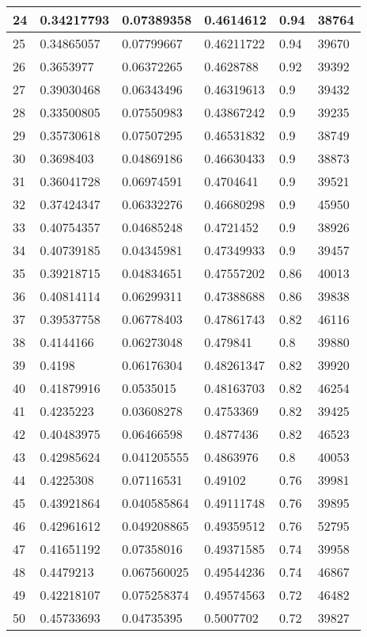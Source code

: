 \begin{longtable}{|l|l|l|l|l|l|}
24 & 0.34217793 & 0.07389358 & 0.4614612 & 0.94 & 38764 \\ \hline 
25 & 0.34865057 & 0.07799667 & 0.46211722 & 0.94 & 39670 \\ \hline 
26 & 0.3653977 & 0.06372265 & 0.4628788 & 0.92 & 39392 \\ \hline 
27 & 0.39030468 & 0.06343496 & 0.46319613 & 0.9 & 39432 \\ \hline 
28 & 0.33500805 & 0.07550983 & 0.43867242 & 0.9 & 39235 \\ \hline 
29 & 0.35730618 & 0.07507295 & 0.46531832 & 0.9 & 38749 \\ \hline 
30 & 0.3698403 & 0.04869186 & 0.46630433 & 0.9 & 38873 \\ \hline 
31 & 0.36041728 & 0.06974591 & 0.4704641 & 0.9 & 39521 \\ \hline 
32 & 0.37424347 & 0.06332276 & 0.46680298 & 0.9 & 45950 \\ \hline 
33 & 0.40754357 & 0.04685248 & 0.4721452 & 0.9 & 38926 \\ \hline 
34 & 0.40739185 & 0.04345981 & 0.47349933 & 0.9 & 39457 \\ \hline 
35 & 0.39218715 & 0.04834651 & 0.47557202 & 0.86 & 40013 \\ \hline 
36 & 0.40814114 & 0.06299311 & 0.47388688 & 0.86 & 39838 \\ \hline 
37 & 0.39537758 & 0.06778403 & 0.47861743 & 0.82 & 46116 \\ \hline 
38 & 0.4144166 & 0.06273048 & 0.479841 & 0.8 & 39880 \\ \hline 
39 & 0.4198 & 0.06176304 & 0.48261347 & 0.82 & 39920 \\ \hline 
40 & 0.41879916 & 0.0535015 & 0.48163703 & 0.82 & 46254 \\ \hline 
41 & 0.4235223 & 0.03608278 & 0.4753369 & 0.82 & 39425 \\ \hline 
42 & 0.40483975 & 0.06466598 & 0.4877436 & 0.82 & 46523 \\ \hline 
43 & 0.42985624 & 0.041205555 & 0.4863976 & 0.8 & 40053 \\ \hline 
44 & 0.4225308 & 0.07116531 & 0.49102 & 0.76 & 39981 \\ \hline 
45 & 0.43921864 & 0.040585864 & 0.49111748 & 0.76 & 39895 \\ \hline 
46 & 0.42961612 & 0.049208865 & 0.49359512 & 0.76 & 52795 \\ \hline 
47 & 0.41651192 & 0.07358016 & 0.49371585 & 0.74 & 39958 \\ \hline 
48 & 0.4479213 & 0.067560025 & 0.49544236 & 0.74 & 46867 \\ \hline 
49 & 0.42218107 & 0.075258374 & 0.49574563 & 0.72 & 46482 \\ \hline 
50 & 0.45733693 & 0.04735395 & 0.5007702 & 0.72 & 39827 \\ \hline 
\end{longtable}